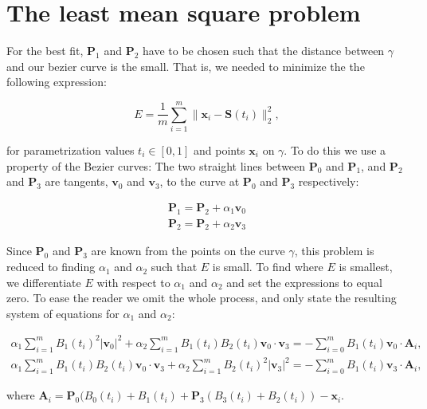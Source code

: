 \documentclass[10pt]{article}
\begin{document}
\section*{The least mean square problem}

For the best fit, $\mathbf{P}_1$ and $\mathbf{P}_2$ have to be chosen such that the distance between $\gamma$ and our bezier curve is the small. That is, we needed to minimize the the following expression:

\begin{equation}
E = \frac{1}{m} \sum_{i=1}^{m} \| \mathbf{x}_i - \mathbf{S}(t_i)\|^2_2,
\end{equation}

for parametrization values $t_i \in [ 0,1 ]$ and points $\mathbf{x}_i$ on $\gamma$. To do this we use a property of the Bezier curves: The two straight lines between $\mathbf{P}_0$ and $\mathbf{P}_1$, and $\mathbf{P}_2$ and $\mathbf{P}_3$ are tangents, $\mathbf{v}_0$ and $\mathbf{v}_3$, to the curve at $\mathbf{P}_0$ and $\mathbf{P}_3$ respectively:

\begin{align}
\mathbf{P}_1 = \mathbf{P}_2 + \alpha_1 \mathbf{v}_0 \\
\mathbf{P}_2 = \mathbf{P}_2 + \alpha_2 \mathbf{v}_3
\end{align}

Since $\mathbf{P}_0$ and $\mathbf{P}_3$ are known from the points on the curve $\gamma$, this problem is reduced to finding $\alpha_1$ and $\alpha_2$ such that $E$ is small. To find where $E$ is smallest, we differentiate $E$ with respect to $\alpha_1$ and $\alpha_2$ and set the expressions to equal zero. To ease the reader we omit the whole process, and only state the resulting system of equations for $\alpha_1$ and $\alpha_2$:


\begin{align}
\alpha_1 \sum_{i = 1}^m B_1(t_i)^2 |\mathbf{v}_0|^2 + \alpha_2 \sum_{i = 1}^m B_1(t_i)B_2(t_i)\mathbf{v}_0 \cdot \mathbf{v}_3 
= - \sum_{i = 0}^m B_1(t_i) \mathbf{v}_0 \cdot \mathbf{A}_i, \\
\alpha_1 \sum_{i = 1}^m B_1(t_i)B_2(t_i)\mathbf{v}_0 \cdot \mathbf{v}_3 + \alpha_2 \sum_{i = 1}^m B_2(t_i)^2 |\mathbf{v}_3|^2 
= - \sum_{i = 0}^m B_1(t_i)\mathbf{v}_3 \cdot \mathbf{A}_i,
\end{align}

where $\mathbf{A}_i = \mathbf{P}_0(B_0(t_i) + B_1(t_i) + \mathbf{P}_3(B_3(t_i) + B_2(t_i)) - \mathbf{x}_i$.
\end{document}
